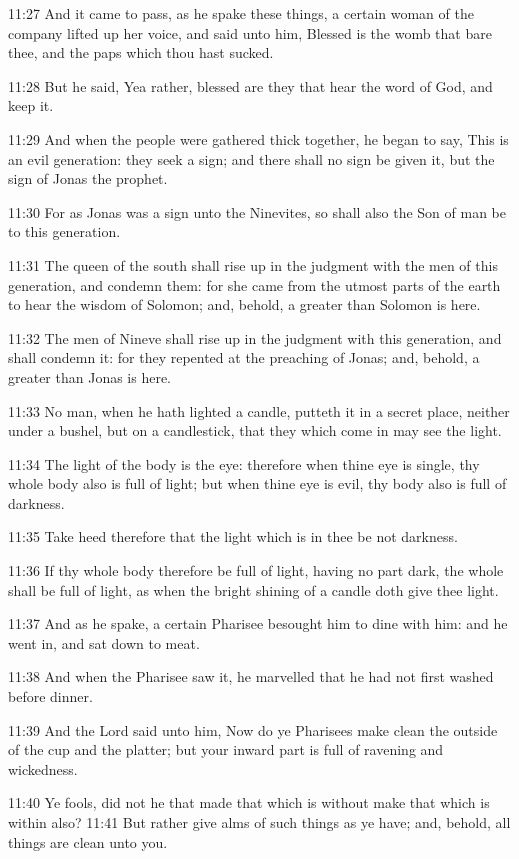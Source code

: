 11:27 And it came to pass, as he spake these things, a certain woman of the company lifted up her voice, and said unto him, Blessed is the womb that bare thee, and the paps which thou hast sucked.

11:28 But he said, Yea rather, blessed are they that hear the word of God, and keep it.

11:29 And when the people were gathered thick together, he began to say, This is an evil generation: they seek a sign; and there shall no sign be given it, but the sign of Jonas the prophet.

11:30 For as Jonas was a sign unto the Ninevites, so shall also the Son of man be to this generation.

11:31 The queen of the south shall rise up in the judgment with the men of this generation, and condemn them: for she came from the utmost parts of the earth to hear the wisdom of Solomon; and, behold, a greater than Solomon is here.

11:32 The men of Nineve shall rise up in the judgment with this generation, and shall condemn it: for they repented at the preaching of Jonas; and, behold, a greater than Jonas is here.

11:33 No man, when he hath lighted a candle, putteth it in a secret place, neither under a bushel, but on a candlestick, that they which come in may see the light.

11:34 The light of the body is the eye: therefore when thine eye is single, thy whole body also is full of light; but when thine eye is evil, thy body also is full of darkness.

11:35 Take heed therefore that the light which is in thee be not darkness.

11:36 If thy whole body therefore be full of light, having no part dark, the whole shall be full of light, as when the bright shining of a candle doth give thee light.

11:37 And as he spake, a certain Pharisee besought him to dine with him: and he went in, and sat down to meat.

11:38 And when the Pharisee saw it, he marvelled that he had not first washed before dinner.

11:39 And the Lord said unto him, Now do ye Pharisees make clean the outside of the cup and the platter; but your inward part is full of ravening and wickedness.

11:40 Ye fools, did not he that made that which is without make that which is within also?  11:41 But rather give alms of such things as ye have; and, behold, all things are clean unto you.

